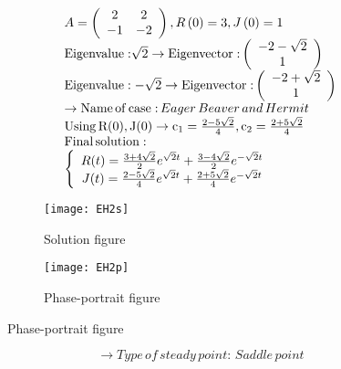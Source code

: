 \documentclass[a4paper]{article}
\begin{document}
\[\begin{array}{l}
A = \left( {\begin{array}{*{20}{c}}
2&2\\
{ - 1}&{ - 2}
\end{array}} \right),R\left( 0 \right) = 3,J\left( 0 \right) = 1\\
{\rm{Eigenvalue:}}\sqrt 2  \to {\rm{Eigenvector:}}\left( {\begin{array}{*{20}{c}}
{ - 2 - \sqrt 2 }\\
1
\end{array}} \right)\\
{\rm{Eigenvalue: - }}\sqrt 2  \to {\rm{Eigenvector:}}\left( {\begin{array}{*{20}{c}}
{ - 2 + \sqrt 2 }\\
1
\end{array}} \right)\\
 \to {\rm{Name}}\,{\rm{of}}\,{\rm{case:}}\,Eager\,Beaver\,and\,Hermit\\
{\rm{Using}}\,{\rm{R(0), J(0)}} \to {{\rm{c}}_1} = \frac{{2 - 5\sqrt 2 }}{4},{\rm{ }}{{\rm{c}}_2} = \frac{{2 + 5\sqrt 2 }}{4}\\
{\rm{Final}}\,{\rm{solution:}}\\
\left\{ {\begin{array}{*{20}{c}}
{R(t) = \frac{{3 + 4\sqrt 2 }}{2}{e^{\sqrt 2 t}} + \frac{{3 - 4\sqrt 2 }}{2}{e^{ - \sqrt 2 t}}}\\
{J(t) = \frac{{2 - 5\sqrt 2 }}{4}{e^{\sqrt 2 t}} + \frac{{2 + 5\sqrt 2 }}{4}{e^{ - \sqrt 2 t}}}
\end{array}} \right.
\end{array}\]
\begin{figure}[H]
\centering
\begin{subfigure}{.5\textwidth}
  \centering
  \texttt{[image: EH2s]}
  \caption*{Solution figure}
\end{subfigure}%
\begin{subfigure}{.5\textwidth}
  \centering
  \texttt{[image: EH2p]}
  \caption*{Phase-portrait figure}
\end{subfigure}
\end{figure}
\[  \to  Type\,of\,steady\,point:\,Saddle\,point\]
\end{document}
